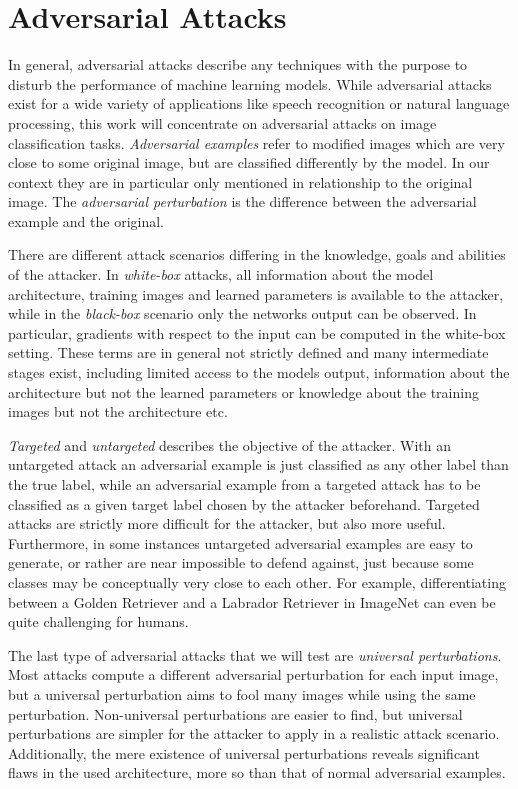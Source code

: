 
\section{Adversarial Attacks}
\label{sec:attacks}

In general, adversarial attacks describe any techniques with the purpose to disturb the performance of machine learning models.
While adversarial attacks exist for a wide variety of applications like speech recognition or natural language processing, this work will concentrate on adversarial attacks on image classification tasks.
\emph{Adversarial examples} refer to modified images which are very close to some original image, but are classified differently by the model.
In our context they are in particular only mentioned in relationship to the original image.
The \emph{adversarial perturbation} is the difference between the adversarial example and the original.

There are different attack scenarios differing in the knowledge, goals and abilities of the attacker.
In \emph{white-box} attacks, all information about the model architecture, training images and learned parameters is available to the attacker, while in the \emph{black-box} scenario only the networks output can be observed.
In particular, gradients with respect to the input can be computed in the white-box setting.
These terms are in general not strictly defined and many intermediate stages exist, including limited access to the models output, information about the architecture but not the learned parameters or knowledge about the training images but not the architecture etc.

\emph{Targeted} and \emph{untargeted} describes the objective of the attacker.
With an untargeted attack an adversarial example is just classified as any other label than the true label, while an adversarial example from a targeted attack has to be classified as a given target label chosen by the attacker beforehand.
Targeted attacks are strictly more difficult for the attacker, but also more useful.
Furthermore, in some instances untargeted adversarial examples are easy to generate, or rather are near impossible to defend against, just because some classes may be conceptually very close to each other.
For example, differentiating between a Golden Retriever and a Labrador Retriever in ImageNet \citep{imagenet} can even be quite challenging for humans.

The last type of adversarial attacks that we will test are \emph{universal perturbations}.
Most attacks compute a different adversarial perturbation for each input image, but a universal perturbation aims to fool many images while using the same perturbation.
Non-universal perturbations are easier to find, but universal perturbations are simpler for the attacker to apply in a realistic attack scenario.
Additionally, the mere existence of universal perturbations reveals significant flaws in the used architecture, more so than that of normal adversarial examples.


